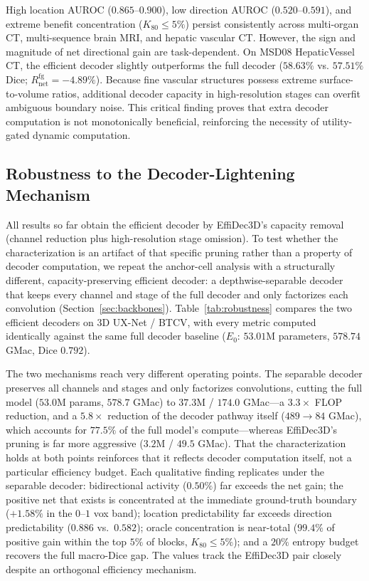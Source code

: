 High location AUROC ($0.865\text{--}0.900$), low direction AUROC ($0.520\text{--}0.591$), and extreme benefit concentration ($K_{80} \le 5\%$) persist consistently across multi-organ CT, multi-sequence brain MRI, and hepatic vascular CT. However, the sign and magnitude of net directional gain are task-dependent. On MSD08 HepaticVessel CT, the efficient decoder slightly outperforms the full decoder ($58.63\%$ vs. $57.51\%$ Dice; $R_{\text{net}}^{\text{fg}} = -4.89\%$). Because fine vascular structures possess extreme surface-to-volume ratios, additional decoder capacity in high-resolution stages can overfit ambiguous boundary noise. This critical finding proves that extra decoder computation is not monotonically beneficial, reinforcing the necessity of utility-gated dynamic computation.

\subsection{Robustness to the Decoder-Lightening Mechanism}
\label{sec:results_robustness}

All results so far obtain the efficient decoder by EffiDec3D's capacity removal (channel reduction plus high-resolution stage omission). To test whether the characterization is an artifact of that specific pruning rather than a property of decoder computation, we repeat the anchor-cell analysis with a structurally different, capacity-preserving efficient decoder: a depthwise-separable decoder \cite{chollet2017xception} that keeps every channel and stage of the full decoder and only factorizes each convolution (Section~\ref{sec:backbones}). Table~\ref{tab:robustness} compares the two efficient decoders on 3D UX-Net / BTCV, with every metric computed identically against the same full decoder baseline ($E_0$: $53.01$M parameters, $578.74$ GMac, Dice $0.792$).

The two mechanisms reach very different operating points. The separable decoder preserves all channels and stages and only factorizes convolutions, cutting the full model ($53.0$M params, $578.7$ GMac) to $37.3$M / $174.0$ GMac---a $3.3\times$ FLOP reduction, and a $5.8\times$ reduction of the decoder pathway itself ($489\rightarrow84$ GMac), which accounts for $77.5\%$ of the full model's compute---whereas EffiDec3D's pruning is far more aggressive ($3.2$M / $49.5$ GMac). That the characterization holds at both points reinforces that it reflects decoder computation itself, not a particular efficiency budget. Each qualitative finding replicates under the separable decoder: bidirectional activity ($0.50\%$) far exceeds the net gain; the positive net that exists is concentrated at the immediate ground-truth boundary ($+1.58\%$ in the $0$--$1$ vox band); location predictability far exceeds direction predictability ($0.886$ vs.\ $0.582$); oracle concentration is near-total ($99.4\%$ of positive gain within the top $5\%$ of blocks, $K_{80}\le5\%$); and a $20\%$ entropy budget recovers the full macro-Dice gap. The values track the EffiDec3D pair closely despite an orthogonal efficiency mechanism.

